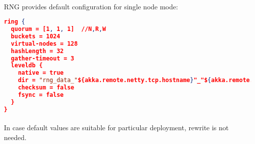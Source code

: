 \paragraph{}
RNG provides default configuration for single node mode:

\begin{lstlisting}[language=json,caption=Example]
ring {
  quorum = [1, 1, 1]  //N,R,W
  buckets = 1024
  virtual-nodes = 128
  hashLength = 32
  gather-timeout = 3
  leveldb {
    native = true
    dir = "rng_data_"${akka.remote.netty.tcp.hostname}"_"${akka.remote.netty.tcp.port}
    checksum = false
    fsync = false
  }
}
\end{lstlisting}

\paragraph{}
In case default values are suitable for particular deployment, rewrite is not needed.
